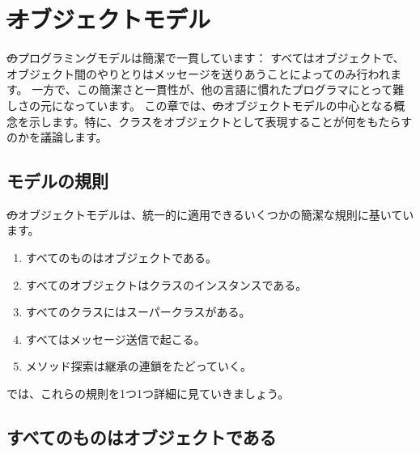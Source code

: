 \documentclass[a4paper,10pt,twoside]{book}
\begin{document}
	\renewcommand{\nnbb}[2]{} %
	\sloppy
\fi
\chapter{\st オブジェクトモデル}

\st のプログラミングモデルは簡潔で一貫しています： すべてはオブジェクトで、オブジェクト間のやりとりはメッセージを送りあうことによってのみ行われます。
一方で、この簡潔さと一貫性が、他の言語に慣れたプログラマにとって難しさの元になっています。
この章では、\st のオブジェクトモデルの中心となる概念を示します。特に、クラスをオブジェクトとして表現することが何をもたらすのかを議論します。

\section{モデルの規則}

\st のオブジェクトモデルは、統一的に適用できるいくつかの簡潔な規則に基いています。

\begin{enumerate}[label={\textbf{Rule \arabic{*}}.}, ref={Rule \arabic{*}}, leftmargin=*]
\item{} 
	すべてのものはオブジェクトである。

\item{} 
	すべてのオブジェクトはクラスのインスタンスである。

\item{}  
	すべてのクラスにはスーパークラスがある。

\item{}  
	すべてはメッセージ送信で起こる。

\item{}  
	メソッド探索は継承の連鎖をたどっていく。

\end{enumerate}

\noindent
では、これらの規則を1つ1つ詳細に見ていきましょう。


\section{すべてのものはオブジェクトである}
\end{document}
